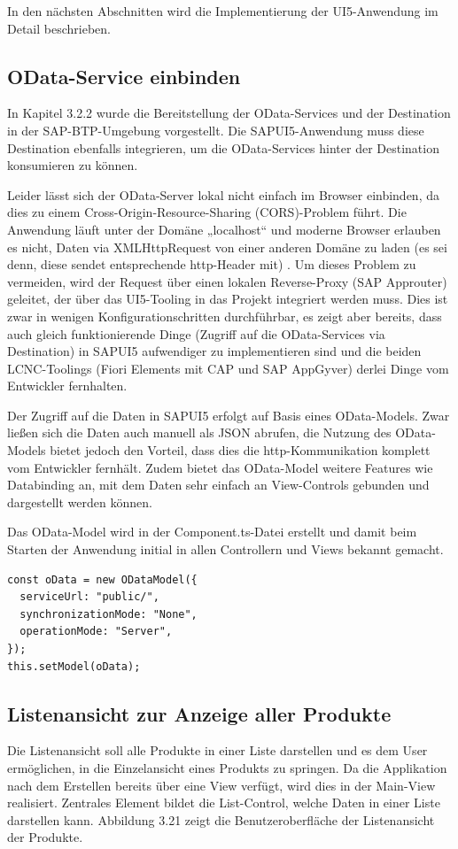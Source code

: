 In den nächsten Abschnitten wird die Implementierung der UI5-Anwendung im Detail beschrieben. 

\subsection{OData-Service einbinden}

In Kapitel 3.2.2 wurde die Bereitstellung der OData-Services und der Destination in der SAP-BTP-Umgebung vorgestellt. Die SAPUI5-Anwendung muss diese Destination ebenfalls integrieren, um die OData-Services hinter der Destination konsumieren zu können. 

Leider lässt sich der OData-Server lokal nicht einfach im Browser einbinden, da dies zu einem Cross-Origin-Resource-Sharing (CORS)-Problem führt. Die Anwendung läuft unter der Domäne „localhost“ und moderne Browser erlauben es nicht, Daten via XMLHttpRequest von einer anderen Domäne zu laden (es sei denn, diese sendet entsprechende http-Header mit) \cite{sud:s25}. Um dieses Problem zu vermeiden, wird der Request über einen lokalen Reverse-Proxy (SAP Approuter) geleitet, der über das UI5-Tooling in das Projekt integriert werden muss. Dies ist zwar in wenigen Konfigurationschritten durchführbar, es zeigt aber bereits, dass auch gleich funktionierende Dinge (Zugriff auf die OData-Services via Destination) in SAPUI5 aufwendiger zu implementieren sind und die beiden LCNC-Toolings (Fiori Elements mit CAP und SAP AppGyver) derlei Dinge vom Entwickler fernhalten.

Der Zugriff auf die Daten in SAPUI5 erfolgt auf Basis eines OData-Models. Zwar ließen sich die Daten auch manuell als JSON abrufen, die Nutzung des OData-Models bietet jedoch den Vorteil, dass dies die http-Kommunikation komplett vom Entwickler fernhält. Zudem bietet das OData-Model weitere Features wie Databinding an, mit dem Daten sehr einfach an View-Controls gebunden und dargestellt werden können. 

Das OData-Model wird in der Component.ts-Datei erstellt und damit beim Starten der Anwendung initial in allen Controllern und Views bekannt gemacht.

\begin{lstlisting}[emph={oData},  caption=Auszüge aus der \texttt{Component.ts}]
const oData = new ODataModel({
  serviceUrl: "public/",
  synchronizationMode: "None",
  operationMode: "Server",
});
this.setModel(oData);
\end{lstlisting}

\subsection{Listenansicht zur Anzeige aller Produkte}
Die Listenansicht soll alle Produkte in einer Liste darstellen und es dem User ermöglichen, in die Einzelansicht eines Produkts zu springen. Da die Applikation nach dem Erstellen bereits über eine View verfügt, wird dies in der Main-View realisiert. Zentrales Element bildet die List-Control, welche Daten in einer Liste darstellen kann. Abbildung 3.21 zeigt die Benutzeroberfläche der Listenansicht der Produkte.

